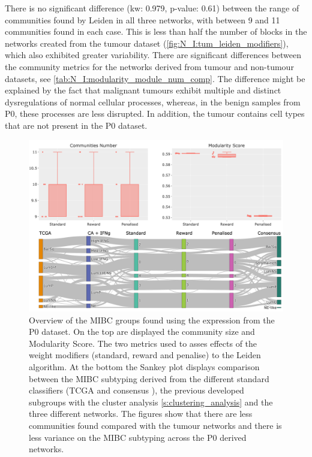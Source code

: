 There is no significant difference (\acrshort{kw}: 0.979, p-value: 0.61) between the range of communities found by Leiden in all three networks, with between 9 and 11 communities found in each case. This is less than half the number of blocks in the networks created from the tumour dataset (\cref{fig:N_I:tum_leiden_modifiers}), which also exhibited greater variability. There are significant differences between the community metrics for the networks derived from tumour and non-tumour datasets, see \cref{tab:N_I:modularity_module_num_comp}. The difference might be explained by the fact that malignant tumours exhibit multiple and distinct dysregulations of normal cellular processes, whereas, in the benign samples from P0, these processes are less disrupted. In addition, the tumour contains cell types that are not present in the P0 dataset.


\begin{figure}[!b]    
    \centering
    \includegraphics[width=1.0\textwidth,keepaspectratio]{Sections/Network_I/Resources/P0/Ldn_Sky_TF_50_RawKMeans_K5_v3.png}
    \caption[P0: Leiden metrics]{Overview of the MIBC groups found using the expression from the P0 dataset. On the top are displayed the community size and Modularity Score. The two metrics used to asses effects of the weight modifiers (standard, reward and penalise) to the Leiden algorithm. At the bottom the Sankey plot displays comparison between the MIBC subtyping derived from the different standard classifiers (TCGA \citep{Robertson2017-mg} and consensus \citep{Kamoun2020-tj}), the previous developed subgroups with the cluster analysis \cref{s:clustering_analysis} and the three different networks. The figures show that there are less communities found compared with the tumour networks and there is less variance on the MIBC subtyping across the P0 derived networks. }
    \label{fig:N_I:p0_sky_leiden}
\end{figure}

